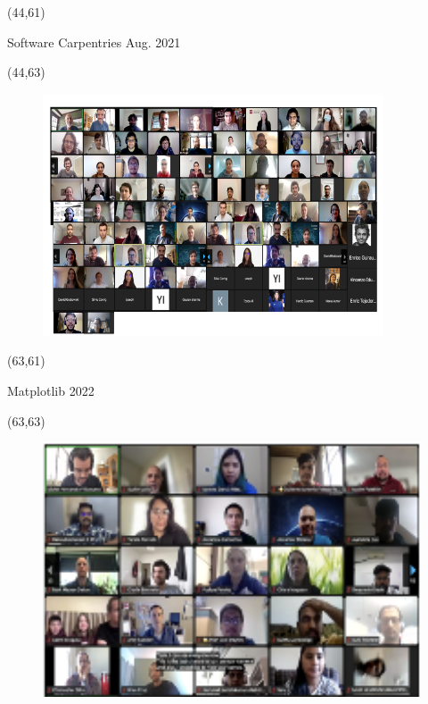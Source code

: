 \documentclass[final]{beamer}
\begin{document}
\begin{frame}{}
\begin{textblock}{19.0}(44,61)
\begin{block}{Software Carpentries Aug. 2021}
\begin{textblock}{19.0}(44,63)
\begin{figure}[tbph]
\centering
\includegraphics[width=0.90\textwidth]{images/software-carpentries-aug2021.png}
\end{figure}
\end{textblock}
\end{block}
\end{textblock}

\begin{textblock}{19.0}(63,61)
\begin{block}{Matplotlib 2022}
\begin{textblock}{19.0}(63,63)
\begin{figure}[tbph]
\centering
\includegraphics[width=1.00\textwidth]{images/matplotlib-2022-1.png}
\end{figure}
\end{textblock}
\end{block}
\end{textblock}



\end{frame}
\end{document}

